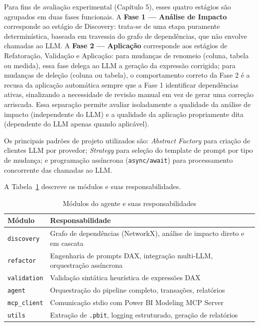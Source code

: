 \documentclass[
    12pt,               %
    openright,          %
    oneside,            %
    a4paper,            %
    chapter=TITLE,      %
    section=TITLE,      %
    brazil              %
]{abntex2}
\begin{document}
Para fins de avaliação experimental (Capítulo 5), esses quatro estágios são agrupados em duas fases funcionais. A \textbf{Fase 1 — Análise de Impacto} corresponde ao estágio de Discovery: trata-se de uma etapa puramente determinística, baseada em travessia do grafo de dependências, que não envolve chamadas ao LLM. A \textbf{Fase 2 — Aplicação} corresponde aos estágios de Refatoração, Validação e Aplicação: para mudanças de renomeio (coluna, tabela ou medida), essa fase delega ao LLM a geração da expressão corrigida; para mudanças de deleção (coluna ou tabela), o comportamento correto da Fase 2 é a recusa da aplicação automática sempre que a Fase 1 identificar dependências ativas, sinalizando a necessidade de revisão manual em vez de gerar uma correção arriscada. Essa separação permite avaliar isoladamente a qualidade da análise de impacto (independente do LLM) e a qualidade da aplicação propriamente dita (dependente do LLM apenas quando aplicável).

Os principais padrões de projeto utilizados são: \textit{Abstract Factory} para criação de clientes LLM por provedor; \textit{Strategy} para seleção do template de prompt por tipo de mudança; e programação assíncrona (\texttt{async/await}) para processamento concorrente das chamadas ao LLM.

A Tabela~\ref{tab:modulos} descreve os módulos e suas responsabilidades.

\begin{table}[H]
    \centering
    \caption{Módulos do agente e suas responsabilidades}
    \label{tab:modulos}
    \begin{tabularx}{\textwidth}{lX}
        \toprule
        \textbf{Módulo} & \textbf{Responsabilidade} \\
        \midrule
        \texttt{discovery}   & Grafo de dependências (NetworkX), análise de impacto direto e em cascata \\
        \texttt{refactor}    & Engenharia de prompts DAX, integração multi-LLM, orquestração assíncrona \\
        \texttt{validation}  & Validação sintática heurística de expressões DAX \\
        \texttt{agent}       & Orquestração do pipeline completo, transações, relatórios \\
        \texttt{mcp\_client} & Comunicação stdio com Power BI Modeling MCP Server \\
        \texttt{utils}       & Extração de \texttt{.pbit}, logging estruturado, geração de relatórios \\
        \bottomrule
    \end{tabularx}
\end{table}
\end{document}
